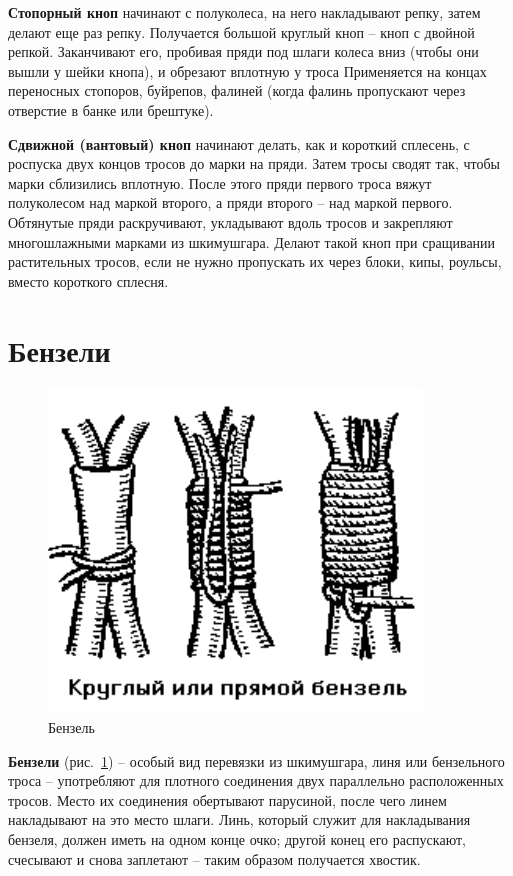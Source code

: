\documentclass[a4paper, 12pt, twoside, final]{scrbook}
\begin{document}
\textbf{Стопорный кноп} начинают с полуколеса, на него накладывают репку, затем делают еще раз репку. Получается большой круглый кноп \--- кноп с двойной репкой. Заканчивают его, пробивая пряди под шлаги колеса вниз (чтобы они вышли у шейки кнопа), и обрезают вплотную у троса Применяется на концах переносных стопоров, буйрепов, фалиней (когда фалинь пропускают через отверстие в банке или брештуке).

\textbf{Сдвижной (вантовый) кноп} начинают делать, как и короткий сплесень, с роспуска двух концов тросов до марки на пряди. Затем тросы сводят так, чтобы марки сблизились вплотную. После этого пряди первого троса вяжут полуколесом над маркой второго, а пряди второго \--- над маркой первого. Обтянутые пряди раскручивают, укладывают вдоль тросов и закрепляют многошлажными марками из шкимушгара. Делают такой кноп при сращивании растительных тросов, если не нужно пропускать их через блоки, кипы, роульсы, вместо короткого сплесня.

\section{Бензели}

\begin{figure}
   \centering
   \includegraphics{pics/70_Benzel} %
   \caption{Бензель}
   \label{fig:70}
\end{figure}

\textbf{Бензели} (рис.~\ref{fig:70}) \--- особый вид перевязки из шкимушгара, линя или бензельного троса \--- употребляют для плотного соединения двух параллельно расположенных тросов. Место их соединения обертывают парусиной, после чего линем накладывают на это место шлаги. Линь, который служит для накладывания бензеля, должен иметь на одном конце очко; другой конец его распускают, счесывают и снова заплетают \--- таким образом получается хвостик.
\end{document}
